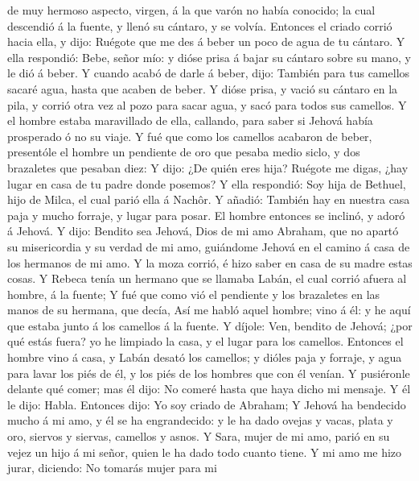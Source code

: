 de muy hermoso aspecto, virgen, á la que varón no había conocido; la
cual descendió á la fuente, y llenó su cántaro, y se volvía.
 Entonces el criado corrió hacia ella, y dijo: Ruégote que
me des á beber un poco de agua de tu cántaro.  Y ella
respondió: Bebe, señor mío: y dióse prisa á bajar su cántaro sobre su
mano, y le dió á beber.  Y cuando acabó de darle á beber,
dijo: También para tus camellos sacaré agua, hasta que acaben de beber.
 Y dióse prisa, y vació su cántaro en la pila, y corrió
otra vez al pozo para sacar agua, y sacó para todos sus camellos.
 Y el hombre estaba maravillado de ella, callando, para
saber si Jehová había prosperado ó no su viaje.  Y fué que
como los camellos acabaron de beber, presentóle el hombre un pendiente
de oro que pesaba medio siclo, y dos brazaletes que pesaban diez:
 Y dijo: ¿De quién eres hija? Ruégote me digas, ¿hay lugar
en casa de tu padre donde posemos?  Y ella respondió: Soy
hija de Bethuel, hijo de Milca, el cual parió ella á Nachôr.
 Y añadió: También hay en nuestra casa paja y mucho
forraje, y lugar para posar.  El hombre entonces se
inclinó, y adoró á Jehová.  Y dijo: Bendito sea Jehová,
Dios de mi amo Abraham, que no apartó su misericordia y su verdad de mi
amo, guiándome Jehová en el camino á casa de los hermanos de mi amo.
 Y la moza corrió, é hizo saber en casa de su madre estas
cosas.  Y Rebeca tenía un hermano que se llamaba Labán, el
cual corrió afuera al hombre, á la fuente;  Y fué que como
vió el pendiente y los brazaletes en las manos de su hermana, que decía,
Así me habló aquel hombre; vino á él: y he aquí que estaba junto á los
camellos á la fuente.  Y díjole: Ven, bendito de Jehová;
¿por qué estás fuera? yo he limpiado la casa, y el lugar para los
camellos.  Entonces el hombre vino á casa, y Labán desató
los camellos; y dióles paja y forraje, y agua para lavar los piés de él,
y los piés de los hombres que con él venían.  Y pusiéronle
delante qué comer; mas él dijo: No comeré hasta que haya dicho mi
mensaje. Y él le dijo: Habla.  Entonces dijo: Yo soy criado
de Abraham;  Y Jehová ha bendecido mucho á mi amo, y él se
ha engrandecido: y le ha dado ovejas y vacas, plata y oro, siervos y
siervas, camellos y asnos.  Y Sara, mujer de mi amo, parió
en su vejez un hijo á mi señor, quien le ha dado todo cuanto tiene.
 Y mi amo me hizo jurar, diciendo: No tomarás mujer para mi
